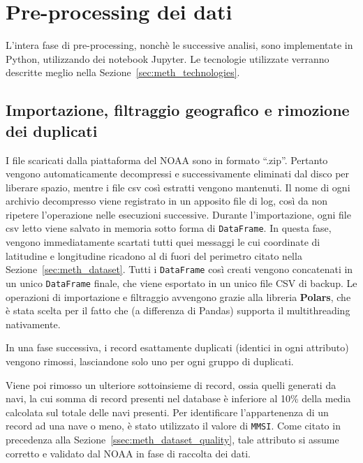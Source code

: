 \section{Pre-processing dei dati}\label{sec:meth_preprocessing}

L'intera fase di pre-processing, nonchè le successive analisi, sono implementate in Python, utilizzando dei notebook Jupyter.
Le tecnologie utilizzate verranno descritte meglio nella Sezione~\ref{sec:meth_technologies}.

\subsection{Importazione, filtraggio geografico e rimozione dei duplicati}

I file scaricati dalla piattaforma del NOAA sono in formato ``.zip''. Pertanto vengono automaticamente decompressi
e successivamente eliminati dal disco per liberare spazio, mentre i file csv così estratti vengono mantenuti.
Il nome di ogni archivio decompresso viene registrato in un apposito file di log, così da non ripetere l'operazione
nelle esecuzioni successive.
Durante l'importazione, ogni file csv letto viene salvato in memoria sotto forma di \texttt{DataFrame}. In questa fase, 
vengono immediatamente scartati tutti quei messaggi le cui coordinate di latitudine e longitudine ricadono
al di fuori del perimetro citato nella Sezione~\ref{sec:meth_dataset}.
Tutti i \texttt{DataFrame} così creati vengono concatenati in un unico \texttt{DataFrame} finale, che viene esportato in un unico file CSV di backup.
Le operazioni di importazione e filtraggio avvengono grazie alla libreria \textbf{Polars}, che è stata scelta per il fatto che (a differenza
di Pandas) supporta il multithreading nativamente. 

In una fase successiva, i record esattamente duplicati (identici in ogni attributo) vengono rimossi, lasciandone solo uno per ogni gruppo di duplicati.

Viene poi rimosso un ulteriore sottoinsieme di record, ossia quelli generati da navi, la cui somma di record presenti nel database è inferiore
al 10\% della media calcolata sul totale delle navi presenti. 
Per identificare l'appartenenza di un record ad una nave o meno, è stato utilizzato il valore di \texttt{MMSI}. Come citato in precedenza alla
Sezione~\ref{ssec:meth_dataset_quality}, tale attributo si assume corretto e validato dal NOAA in fase di raccolta dei dati.

